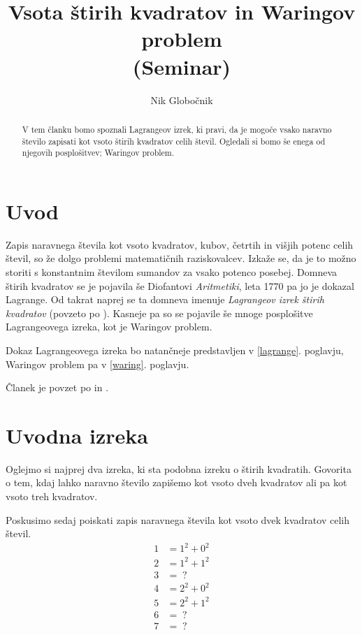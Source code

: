 \documentclass[a4paper]{amsart}
\theoremstyle{definition}
\theoremstyle{plain}
\numberwithin{equation}{section}
\begin{document}
\title{Vsota \v{s}tirih kvadratov in Waringov problem \\ \footnotesize (Seminar)\normalsize}

\author{Nik Globočnik}

\maketitle

\begin{abstract}
	V tem članku bomo spoznali Lagrangeov izrek, ki pravi, da je mogoče vsako naravno število zapisati kot vsoto štirih kvadratov celih števil. Ogledali si bomo še enega od njegovih posplošitvev; Waringov problem.
\end{abstract}

\maketitle



\section{Uvod}

Zapis naravnega števila kot vsoto kvadratov, kubov, četrtih in višjih potenc celih števil, so že dolgo problemi matematičnih raziskovalcev. Izkaže se, da je to možno storiti s konstantnim številom sumandov za vsako potenco posebej. Domneva štirih kvadratov se je pojavila še Diofantovi \emph{Aritmetiki}, leta 1770 pa jo je dokazal Lagrange. Od takrat naprej se ta domneva imenuje \emph{Lagrangeov izrek štirih kvadratov} (povzeto po \cite{Arslan}). Kasneje pa so se pojavile še mnoge posplošitve Lagrangeovega izreka, kot je Waringov problem. 

Dokaz Lagrangeovega izreka bo natančneje predstavljen v \ref{lagrange}. poglavju, Waringov problem pa v \ref{waring}. poglavju.

Članek je povzet po \cite{Lalin} in \cite{Suomalainen}.

\section{Uvodna izreka}

Oglejmo si najprej dva izreka, ki sta podobna  izreku o štirih kvadratih. Govorita o tem, kdaj lahko naravno število zapišemo kot vsoto dveh kvadratov ali pa kot vsoto treh kvadratov.
\par
Poskusimo sedaj poiskati zapis naravnega števila kot vsoto dvek kvadratov celih števil. 
\begin{align*}
	1 &= 1^2 + 0^2 \\ 
	2 &= 1^2 + 1^2 \\ 
	3 &=\; ? \\ 
	4 &= 2^2 + 0^2 \\ 
	5 &= 2^2 + 1^2 \\ 
	6 &= \; ?\\ 
	7 &= \; ? 
\end{align*}
\end{document}
